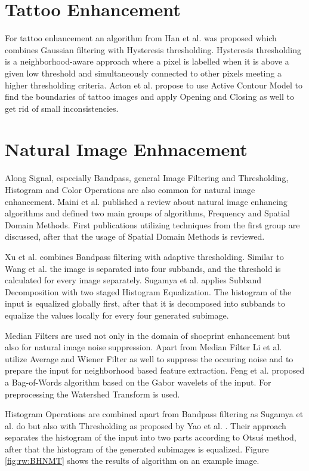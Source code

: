 \documentclass[draft,final]{vutinfth} %
\begin{document}
\section*{Tattoo Enhancement}

For tattoo enhancement an algorithm from Han et al. \cite{han2013tattoo} was proposed which combines Gaussian filtering with Hysteresis thresholding. 
Hysteresis thresholding is a neighborhood-aware approach where a pixel is labelled when it is above a given low threshold and simultaneously connected to other pixels meeting a higher thresholding criteria.
Acton et al. \cite{acton2008matching} propose to use Active Contour Model to find the boundaries of tattoo images and apply Opening and Closing as well to get rid of small inconsistencies.

\section*{Natural Image Enhnacement}
\par
Along Signal, especially Bandpass, general Image Filtering and Thresholding, Histogram and Color Operations are also common for natural image enhancement.
Maini et al. \cite{maini2010comprehensive} published a review about natural image enhancing algorithms and defined two main groups of algorithms, Frequency and Spatial Domain Methods.
First publications utilizing techniques from the first group are discussed, after that the usage of Spatial Domain Methods is reviewed.
\par
Xu et al. \cite{xu2016image} combines Bandpass filtering with adaptive thresholding.
Similar to Wang et al. \cite{wang2014enhanced} the image is separated into four subbands, and the threshold is calculated for every image separately.
Sugamya et al. \cite{sugamya2016image} applies Subband Decomposition with two staged Histogram Equalization.
The histogram of the input is equalized globally first, after that it is decomposed into subbands to equalize the values locally for every four generated subimage.
\par
Median Filters are used not only in the domain of shoeprint enhancement \cite{alizadeh2017automatic} but also for natural image noise suppression.
Apart from Median Filter Li et al. \cite{li2014rapid} utilize Average and Wiener Filter as well to suppress the occuring noise and to prepare the input for neighborhood based feature extraction.
Feng et al. \cite{feng2011bag} proposed a Bag-of-Words algorithm based on the Gabor wavelets of the input. 
For preprocessing the Watershed Transform is used.
\par
Histogram Operations are combined apart from Bandpass filtering as Sugamya et al. \cite{sugamya2016image} do but also with Thresholding as proposed by Yao et al. \cite{yao2016image}.
Their approach separates the histogram of the input into two parts according to Otsu\'s method, after that the histogram  of the generated subimages is equalized.
Figure \ref{fig:rw:BHNMT} shows the results of algorithm on an example image.
\end{document}
